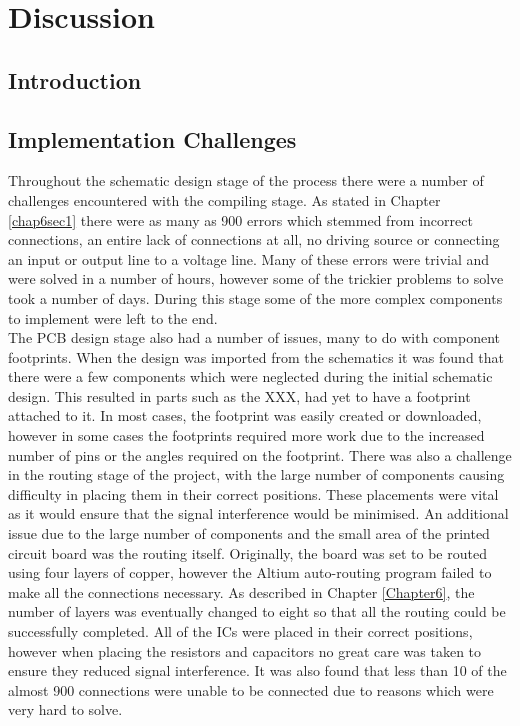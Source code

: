 
\chapter{Discussion} %

\label{Chapter7} %

\section{Introduction}

\section{Implementation Challenges}

	Throughout the schematic design stage of the process there were a number of challenges encountered with the compiling stage. 
As stated in Chapter \ref{chap6sec1} there were as many as 900 errors which stemmed from incorrect connections, an entire lack of connections at all, no driving source or connecting an input or output line to a voltage line. 
Many of these errors were trivial and were solved in a number of hours, however some of the trickier problems to solve took a number of days.
During this stage some of the more complex components to implement were left to the end.\\

	The PCB design stage also had a number of issues, many to do with component footprints. 
When the design was imported from the schematics it was found that there were a few components which were neglected during the initial schematic design. This resulted in parts such as the XXX, had yet to have a footprint attached to it. 
In most cases, the footprint was easily created or downloaded, however in some cases the footprints required more work due to the increased number of pins or the angles required on the footprint. 
There was also a challenge in the routing stage of the project, with the large number of components causing difficulty in placing them in their correct positions. These placements were vital as it would ensure that the signal interference would be minimised. 
An additional issue due to the large number of components and the small area of the printed circuit board was the routing itself. 
Originally, the board was set to be routed using four layers of copper, however the Altium auto-routing program failed to make all the connections necessary.
As described in Chapter \ref{Chapter6}, the number of layers was eventually changed to eight so that all the routing could be successfully completed. 
All of the ICs were placed in their correct positions, however when placing the resistors and capacitors no great care was taken to ensure they reduced signal interference. 
It was also found that less than 10 of the almost 900 connections were unable to be connected due to reasons which were very hard to solve.\\

